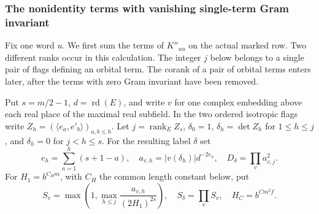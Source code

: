 \subsubsection{The nonidentity terms with vanishing single-term Gram invariant}
\label{subsec:zero-gram-diagonal}

Fix one word \(u\). We first sum the terms of \(K''_{uu}\) on the actual marked row. Two different ranks occur in this calculation. The integer \(j\) below belongs to a single pair of flags defining an orbital term. The corank of a pair of orbital terms enters later, after the terms with zero Gram invariant have been removed.

\begin{definition}\label{def:zero-gram-label}
Put \(s=m/2-1\), \(d=\operatorname{rd}(E)\), and write \(v\) for one complex embedding above each real place of the maximal real subfield. In the two ordered isotropic flags write \(Z_h=(\langle e_a,e'_b\rangle)_{a,b\le h}\). Let \(j=\operatorname{rank}_E Z_s\), \(\delta_0=1\), \(\delta_h=\det Z_h\) for \(1\le h\le j\), and \(\delta_h=0\) for \(j<h\le s\). For the resulting label \(\delta\) set
\[
 e_h=\sum_{a=1}^h(s+1-a),\quad
 a_{v,h}=|v(\delta_h)|d^{-2e_h},\quad
 D_\delta=\prod_v a_{v,j}^2.
\]
For \(H_1=b^{C_Hm}\), with \(C_H\) the common length constant below, put
\[
 S_v=\max\left(1,\max_{h\le j}\frac{a_{v,h}}{(2H_1)^{2s}}\right),
 \quad S_\delta=\prod_v S_v,\quad H_C=b^{Cm^2f}.
\]
\end{definition}

